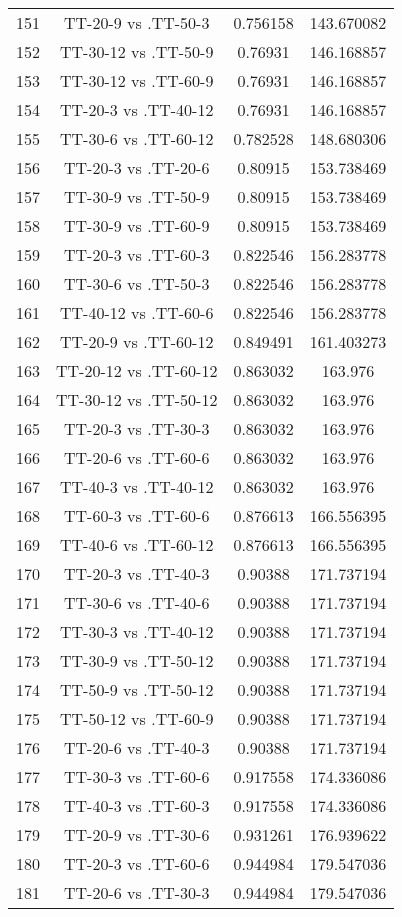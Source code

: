 \documentclass[a4paper,10pt]{article}
\begin{document}
\begin{landscape}
\begin{table}[!htp]
\begin{tabular}{cccc}
151&TT-20-9 vs .TT-50-3&0.756158&143.670082\\
152&TT-30-12 vs .TT-50-9&0.76931&146.168857\\
153&TT-30-12 vs .TT-60-9&0.76931&146.168857\\
154&TT-20-3 vs .TT-40-12&0.76931&146.168857\\
155&TT-30-6 vs .TT-60-12&0.782528&148.680306\\
156&TT-20-3 vs .TT-20-6&0.80915&153.738469\\
157&TT-30-9 vs .TT-50-9&0.80915&153.738469\\
158&TT-30-9 vs .TT-60-9&0.80915&153.738469\\
159&TT-20-3 vs .TT-60-3&0.822546&156.283778\\
160&TT-30-6 vs .TT-50-3&0.822546&156.283778\\
161&TT-40-12 vs .TT-60-6&0.822546&156.283778\\
162&TT-20-9 vs .TT-60-12&0.849491&161.403273\\
163&TT-20-12 vs .TT-60-12&0.863032&163.976\\
164&TT-30-12 vs .TT-50-12&0.863032&163.976\\
165&TT-20-3 vs .TT-30-3&0.863032&163.976\\
166&TT-20-6 vs .TT-60-6&0.863032&163.976\\
167&TT-40-3 vs .TT-40-12&0.863032&163.976\\
168&TT-60-3 vs .TT-60-6&0.876613&166.556395\\
169&TT-40-6 vs .TT-60-12&0.876613&166.556395\\
170&TT-20-3 vs .TT-40-3&0.90388&171.737194\\
171&TT-30-6 vs .TT-40-6&0.90388&171.737194\\
172&TT-30-3 vs .TT-40-12&0.90388&171.737194\\
173&TT-30-9 vs .TT-50-12&0.90388&171.737194\\
174&TT-50-9 vs .TT-50-12&0.90388&171.737194\\
175&TT-50-12 vs .TT-60-9&0.90388&171.737194\\
176&TT-20-6 vs .TT-40-3&0.90388&171.737194\\
177&TT-30-3 vs .TT-60-6&0.917558&174.336086\\
178&TT-40-3 vs .TT-60-3&0.917558&174.336086\\
179&TT-20-9 vs .TT-30-6&0.931261&176.939622\\
180&TT-20-3 vs .TT-60-6&0.944984&179.547036\\
181&TT-20-6 vs .TT-30-3&0.944984&179.547036\\

\end{tabular}
\end{table}
\end{landscape}
\end{document}
